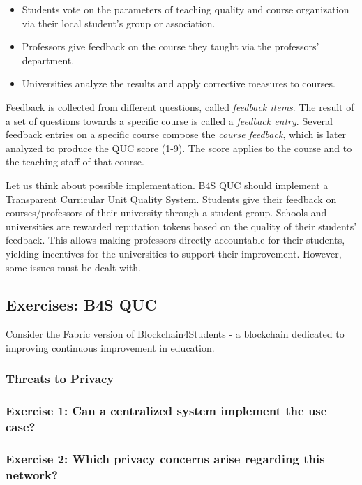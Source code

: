 \documentclass[12pt,a4paper]{article}
\theoremstyle{definition}
\begin{document}
\begin{itemize}
\item Students vote on the parameters of teaching quality and course organization via their local student's group or association.
\item Professors give feedback on the course they taught via the professors' department.
\item Universities analyze the results and apply corrective measures to courses.

\end{itemize}

Feedback is collected from different questions, called \emph{feedback items}. The result of a set of questions towards a specific course is called a \emph{feedback entry}. Several feedback entries on a specific course compose the \emph{course feedback}, which is later analyzed to produce the QUC score (1-9). The score applies to the course and to the teaching staff of that course.

Let us think about possible implementation. B4S QUC should implement a Transparent Curricular Unit Quality System. Students give their feedback on courses/professors of their university through a student group. Schools and universities are rewarded reputation tokens based on the quality of their students' feedback. This allows making professors directly accountable for their students, yielding incentives for the universities to support their improvement.  However, some issues must be dealt with.



\subsection{Exercises: B4S QUC}

Consider the Fabric version of Blockchain4Students - a blockchain dedicated to improving continuous improvement in education.

\subsubsection{Threats to Privacy}

\subsubsection*{Exercise 1: Can a centralized system implement the use case?}

\subsubsection*{Exercise 2: Which privacy concerns arise regarding this network?}
\end{document}
